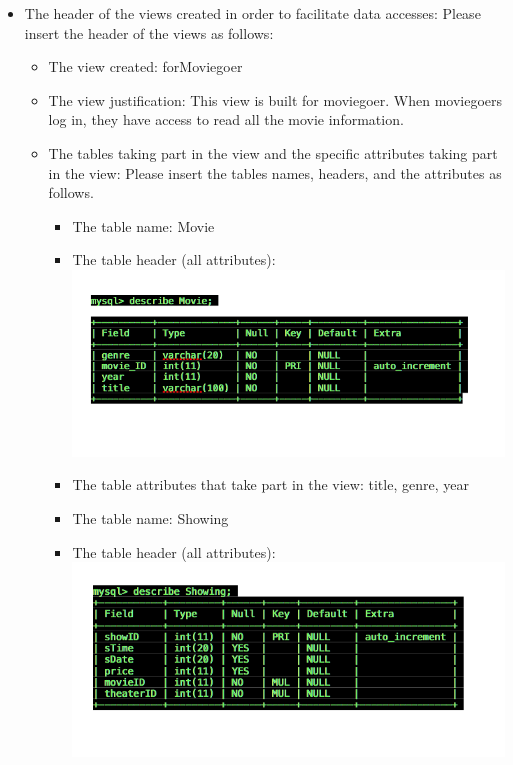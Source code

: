 {\begin{itemize}
\begin{itemize}
	\item{The error message example according to user(s) scenario(s): }
	if someone really liked a movie and wants to give them 100 rating , it will not be allowed because it would not be fair to the other movies, and it is not allowed because it is not the 1-10 common scale we are using for this theater management  
	 \end{itemize}
\item{The header of the views created in order to facilitate data accesses:}
Please insert the header of the views as follows:
\begin{itemize} 
	\item{The view created: }
	forMoviegoer
	\item{The view justification: }
	This view is built for moviegoer. When moviegoers log in, they have access to read all the movie information.
	\item{The tables taking part in the view and the specific attributes taking part in the view: }
	Please insert the tables names, headers, and the attributes as follows.
	\begin{itemize} 
		\item{The table name: }
		Movie
		\item{The table header (all attributes): }
		\includegraphics[scale=0.3]{describemovie.png}
		\item{The table attributes that take part in the view: }
		title, genre, year
	\end{itemize}
	\begin{itemize} 
		\item{The table name: }
		Showing
		\item{The table header (all attributes): }
		\includegraphics[scale=0.3]{desshowing.png}

\end{itemize}
\end{itemize}
\end{itemize}}

